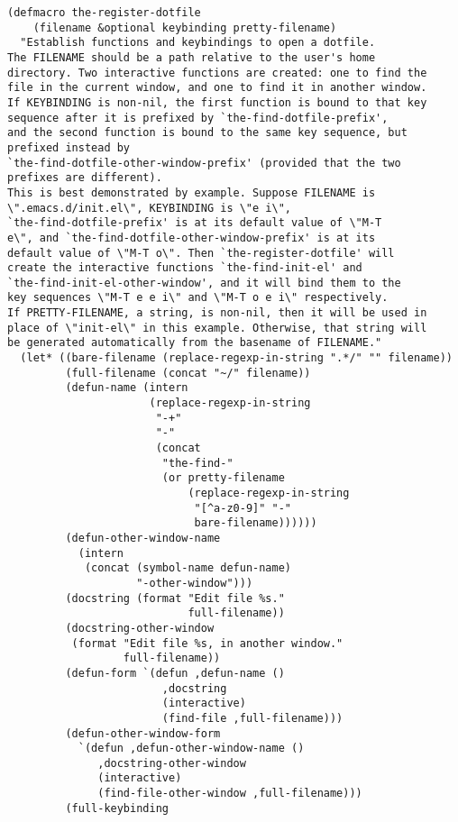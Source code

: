 \documentclass[11pt]{article}
\begin{document}
\begin{enumerate}
\begin{verbatim}
(defmacro the-register-dotfile
    (filename &optional keybinding pretty-filename)
  "Establish functions and keybindings to open a dotfile.
The FILENAME should be a path relative to the user's home
directory. Two interactive functions are created: one to find the
file in the current window, and one to find it in another window.
If KEYBINDING is non-nil, the first function is bound to that key
sequence after it is prefixed by `the-find-dotfile-prefix',
and the second function is bound to the same key sequence, but
prefixed instead by
`the-find-dotfile-other-window-prefix' (provided that the two
prefixes are different).
This is best demonstrated by example. Suppose FILENAME is
\".emacs.d/init.el\", KEYBINDING is \"e i\",
`the-find-dotfile-prefix' is at its default value of \"M-T
e\", and `the-find-dotfile-other-window-prefix' is at its
default value of \"M-T o\". Then `the-register-dotfile' will
create the interactive functions `the-find-init-el' and
`the-find-init-el-other-window', and it will bind them to the
key sequences \"M-T e e i\" and \"M-T o e i\" respectively.
If PRETTY-FILENAME, a string, is non-nil, then it will be used in
place of \"init-el\" in this example. Otherwise, that string will
be generated automatically from the basename of FILENAME."
  (let* ((bare-filename (replace-regexp-in-string ".*/" "" filename))
         (full-filename (concat "~/" filename))
         (defun-name (intern
                      (replace-regexp-in-string
                       "-+"
                       "-"
                       (concat
                        "the-find-"
                        (or pretty-filename
                            (replace-regexp-in-string
                             "[^a-z0-9]" "-"
                             bare-filename))))))
         (defun-other-window-name
           (intern
            (concat (symbol-name defun-name)
                    "-other-window")))
         (docstring (format "Edit file %s."
                            full-filename))
         (docstring-other-window
          (format "Edit file %s, in another window."
                  full-filename))
         (defun-form `(defun ,defun-name ()
                        ,docstring
                        (interactive)
                        (find-file ,full-filename)))
         (defun-other-window-form
           `(defun ,defun-other-window-name ()
              ,docstring-other-window
              (interactive)
              (find-file-other-window ,full-filename)))
         (full-keybinding

\end{verbatim}
\end{enumerate}
\end{document}
